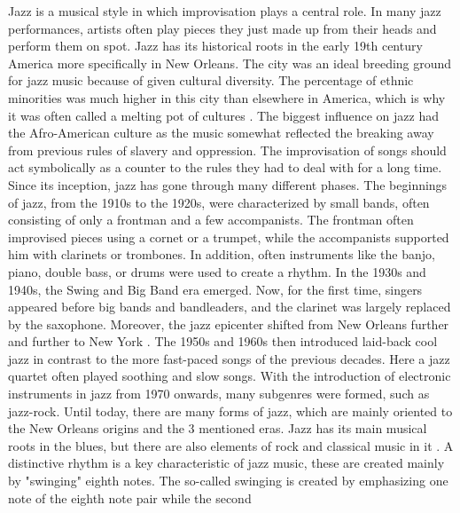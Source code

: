 Jazz is a musical style in which improvisation plays a central role.
In many jazz performances, artists often play pieces they just made up from their heads and
perform them on spot.
Jazz has its historical roots in the early 19th century America more specifically in New Orleans.
The city was an ideal breeding ground for jazz music because of given cultural diversity.
The percentage of ethnic minorities was much higher in this city than elsewhere in America,
which is why it was often called a melting pot of cultures \cite{Beek2021Jazz}. 
The biggest influence on jazz had the Afro-American culture as the music somewhat
reflected the breaking away from previous rules of slavery and oppression.
The improvisation of songs should act symbolically as a counter to the rules they had to deal with for a
long time.
Since its inception, jazz has gone through many different phases.
The beginnings of jazz, from the 1910s to the 1920s, were characterized by small bands,
often consisting of only a frontman and a few accompanists.
The frontman often improvised pieces using a cornet or a trumpet,
while the accompanists supported him with clarinets or trombones.
In addition, often instruments like the banjo, piano, double bass, or drums were used to create a rhythm.
In the 1930s and 1940s, the Swing and Big Band era emerged.
Now, for the first time, singers appeared before big bands and bandleaders,
and the clarinet was largely replaced by the saxophone.
Moreover, the jazz epicenter shifted from New Orleans further and further to New York \cite{Wildridge2020}.
The 1950s and 1960s then introduced laid-back cool jazz in contrast to the more fast-paced songs
of the previous decades.
Here a jazz quartet often played soothing and slow songs. With the introduction of electronic
instruments in jazz from 1970 onwards, many subgenres were formed, such as jazz-rock.
Until today, there are many forms of jazz, which are mainly oriented to the New Orleans origins
and the 3 mentioned eras.
Jazz has its main musical roots in the blues, but there are also elements of rock and classical music in it \cite{JazzAmHistory}.
A distinctive rhythm is a key characteristic of jazz music,
these are created mainly by "swinging" eighth notes.
The so-called swinging is created by emphasizing one note of the eighth note pair while the second
